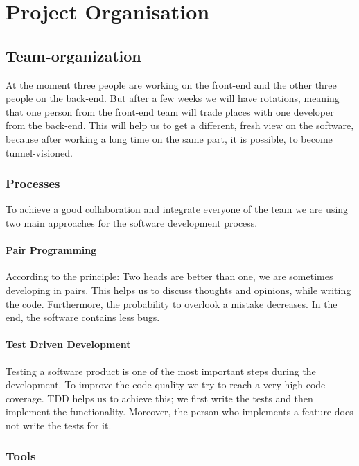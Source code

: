 \documentclass[10pt]{scrartcl}
\begin{document}
\section{Project Organisation}

\subsection{Team-organization}

At the moment three people are working on the front-end and the other three people on the back-end. But after a few weeks we will have rotations, meaning that one person from the front-end team will trade places with one developer from the back-end. This will help us to get a different, fresh view on the software, because after working a long time on the same part, it is possible, to become \grqq{}tunnel-visioned\grqq{}.

\subsubsection{Processes}

To achieve a good collaboration and integrate everyone of the team we are using two main approaches for the software development process.

\paragraph{Pair Programming}

According to the principle: Two heads are better than one, we are sometimes developing in pairs. This helps us to discuss thoughts and opinions, while writing the code. Furthermore, the probability to overlook a mistake decreases. In the end, the software contains less bugs.

\paragraph{Test Driven Development}

Testing a software product is one of the most important steps during the development. To improve the code quality we try to reach a very high code coverage. TDD helps us to achieve this;  we first write the tests and then implement the functionality. Moreover, the person who implements a feature does not write the tests for it. 

\subsubsection{Tools}
\end{document}

